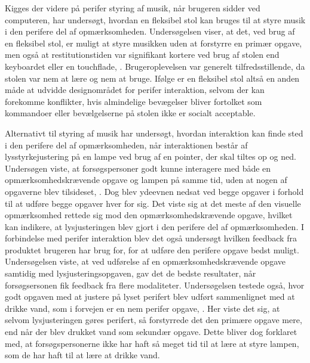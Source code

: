 Kigges der videre på perifer styring af musik, når brugeren sidder ved computeren, har \textcite[ss. 5-9]{PDF:AChairAsUbiquitousInputDevice} undersøgt, hvordan en fleksibel stol kan bruges til at styre musik i den perifere del af opmærksomheden. Undersøgelsen viser, at det, ved brug af en fleksibel stol, er muligt at styre musikken uden at forstyrre en primær opgave, men også at restitutionstiden var signifikant kortere ved brug af stolen end keyboardet eller en touchflade, \parencite[s. 7]{PDF:AChairAsUbiquitousInputDevice}. Brugeroplevelsen var generelt tilfredsstillende, da stolen var nem at lære og nem at bruge. Ifølge \textcite[s. 8]{PDF:AChairAsUbiquitousInputDevice} er en fleksibel stol altså en anden måde at udvidde designområdet for perifer interaktion, selvom der kan forekomme konflikter, hvis almindelige bevægelser bliver fortolket som kommandoer eller bevælgelserne på stolen ikke er socialt acceptable.

Alternativt til styring af musik har \textcite[s. 1]{PDF:FacilitatingPIDesignAndEvaluation} undersøgt, hvordan interaktion kan finde sted i den perifere del af opmærksomheden, når interaktionen består af lysstyrkejustering på en lampe ved brug af en pointer, der skal tiltes op og ned. Undersøgen viste, at forsøgspersoner godt kunne interagere med både en opmærksomhedskrævende opgave og lampen på samme tid, uden at nogen af opgaverne blev tilsideset, \parencite[ss. 20-21]{PDF:FacilitatingPIDesignAndEvaluation}. Dog blev ydeevnen nedsat ved begge opgaver i forhold til at udføre begge opgaver hver for sig. Det viste sig at det meste af den visuelle opmærksomhed rettede sig mod den opmærksomhedskrævende opgave, hvilket kan indikere, at lysjusteringen blev gjort i den perifere del af opmærksomheden. I forbindelse med perifer interaktion blev det også undersøgt hvilken feedback fra produktet brugeren har brug for, for at udføre den perifere opgave bedst muligt. Undersøgelsen viste, at ved udførelse af en opmærksomhedskrævende opgave samtidig med lysjusteringsopgaven, gav det de bedste resultater, når forsøgsersonen fik feedback fra flere modaliteter.  Undersøgelsen testede også, hvor godt opgaven med at justere på lyset perifert blev udført sammenlignet med at drikke vand, som i forvejen er en nem perifer opgave, \parencite[s. 20]{PDF:FacilitatingPIDesignAndEvaluation}. Her viste det sig, at selvom lysjusteringen gøres perifert, så forstyrrede det den primære opgave mere, end når der blev drukket vand som sekundær opgave. Dette bliver dog forklaret med, at forsøgspersonerne ikke har haft så meget tid til at lære at styre lampen, som de har haft til at lære at drikke vand. 

